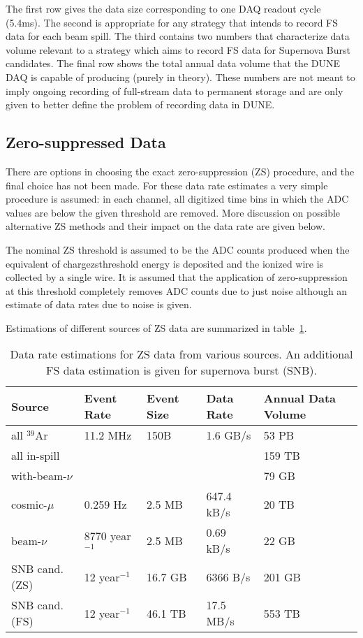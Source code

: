 The first row gives the data size corresponding to one DAQ readout cycle (5.4ms).
The second is appropriate for any strategy that intends to record FS data for each beam spill.
The third contains two numbers that characterize data volume relevant to a strategy which aims
to record FS data for Supernova Burst candidates. The final row  shows the total annual data
volume that the DUNE DAQ is capable of producing (purely in theory).
These numbers are not meant to imply ongoing recording of full-stream
data to permanent storage and are only given to better define the problem of recording data in DUNE.


\subsection{Zero-suppressed Data}

There are options in choosing the exact zero-suppression (ZS) procedure,
and the final choice has not been made. For these data rate estimates a very
simple procedure is assumed: in each channel, all digitized time bins in which the ADC
values are below the given threshold are removed. More discussion on possible alternative
ZS methods and their impact on the data rate are given below.

The nominal ZS threshold is assumed to be the ADC counts produced when
the equivalent of chargezsthreshold energy is deposited and the
ionized wire is collected by a single wire.
It is assumed that the application of zero-suppression at this
threshold completely removes ADC counts due to just noise although an
estimate of data rates due to noise is given.

Estimations of different sources of ZS data are summarized in table~\ref{tab:zs-volume}.

	
\begin{table}[ht!]
\centering
\begin{tabular}{| p{1.25in} | p{0.95in} | p{0.75in} | p{1in} | p{0.75in} |}		\hline		
Source & Event Rate & Event Size & Data Rate & Annual Data Volume \\ \hline
all $^{39}$Ar & 11.2 MHz & 150B & 1.6 GB/s &  53 PB \\ \hline
all in-spill & & & & 159 TB \\ \hline
with-beam-$\nu$ & & & & 79 GB \\ \hline
cosmic-$\mu$ & 0.259 Hz &2.5 MB & 647.4 kB/s & 20 TB \\	\hline
beam-$\nu$ & 8770 year$^{-1}$ & 2.5 MB & 0.69 kB/s & 22 GB \\ \hline
SNB cand. (ZS) & 12 year$^{-1}$ & 16.7 GB & 6366 B/s & 201 GB \\ \hline
SNB cand. (FS) & 12 year$^{-1}$ & 46.1 TB & 17.5 MB/s & 553 TB \\ \hline
\end{tabular}
\caption{Data rate estimations for ZS data from various sources.
An additional FS data estimation is given for supernova burst (SNB).}
\label{tab:zs-volume}
\end{table}


